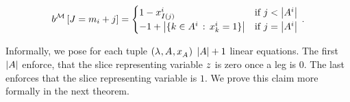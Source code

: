 \begin{align}
    \label{eq:ilpRhs}
    \rhsofat{\sliceset}{\datvariable=\datanum_{\decindex}+\datindex} =
    \begin{cases}
        1 - \catindexof{\indexinterpretationat{\datindex}}^{\decindex} & \text{if }  \datindex < \cardof{\variablesetof{\decindex}} \\ %
        -1 + \cardof{\{\catenumerator\in\variablesetof{\decindex} \wcols  \catindexof{\catenumerator}^{\decindex} = 1\}}  & \text{if }  \datindex = \cardof{\variablesetof{\decindex}} \\ %
    \end{cases} \, .
\end{align}


Informally, we pose for each tuple $(\lambda^{}, A^{}, x_{A^{}}^{})$ $\left|A\right|+1$ linear equations.
The first $\left|A\right|$ enforce, that the slice representing variable $z$ is zero once a leg is $0$.
The last enforces that the slice representing variable is $1$.
We prove this claim more formally in the next theorem.

